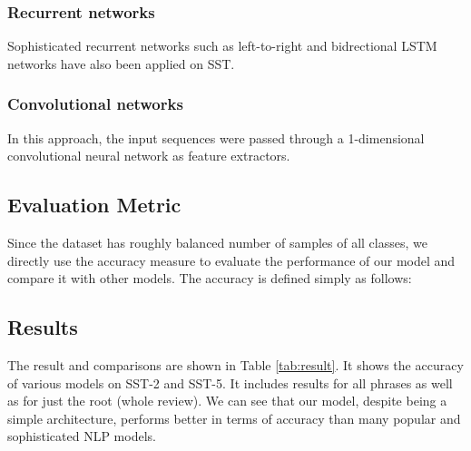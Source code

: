 \documentclass[conference]{IEEEtran}
\begin{document}
\subsubsection{Recurrent networks}
Sophisticated recurrent networks such as left-to-right and bidrectional LSTM networks have also been applied on SST\cite{lstm}.

\subsubsection{Convolutional networks}
In this approach, the input sequences were passed through a 1-dimensional convolutional neural network as feature extractors\cite{cnn}.

\subsection{Evaluation Metric}

Since the dataset has roughly balanced number of samples of all classes, we directly use the accuracy measure to evaluate the performance of our model and compare it with other models. The accuracy is defined simply as follows:


\subsection{Results}

The result and comparisons are shown in Table \ref{tab:result}. It shows the accuracy of various models on SST-2 and SST-5. It includes results for all phrases as well as for just the root (whole review). We can see that our model, despite being a simple architecture, performs better in terms of accuracy than many popular and sophisticated NLP models.
\end{document}
